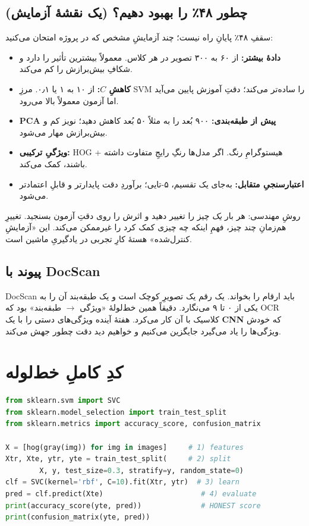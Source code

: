 \documentclass[12pt,a4paper]{article}
\begin{document}
\subsection{چطور ۴۸٪ را بهبود دهیم؟ (یک نقشهٔ آزمایش)}

سقفِ ۴۸٪ پایانِ راه نیست؛ چند آزمایشِ مشخص که در پروژه امتحان می‌کنید:

\begin{itemize}
  \item \textbf{دادهٔ بیشتر:} از ۶۰ به ۳۰۰ تصویر در هر کلاس. معمولاً بیشترین تأثیر را دارد و شکافِ بیش‌برازش را کم می‌کند.
  \item \textbf{کاهشِ $C$:} از ۱۰ به ۱ یا ۰٫۱. مرزِ SVM را ساده‌تر می‌کند؛ دقتِ آموزش پایین می‌آید اما آزمون معمولاً بالا می‌رود.
  \item \textbf{PCA پیش از طبقه‌بندی:} ۹۰۰ بُعد را به مثلاً ۵۰ بُعد کاهش دهید؛ نویز کم و بیش‌برازش مهار می‌شود.
  \item \textbf{ویژگیِ ترکیبی:} HOG + هیستوگرامِ رنگ. اگر مدل‌ها رنگِ رایجِ متفاوت داشته باشند، کمک می‌کند.
  \item \textbf{اعتبارسنجیِ متقابل:} به‌جای یک تقسیم، ۵-تایی؛ برآوردِ دقت پایدارتر و قابلِ اعتمادتر می‌شود.
\end{itemize}

\begin{nokte}
روشِ مهندسی: هر بار \emph{یک} چیز را تغییر دهید و اثرش را روی دقتِ آزمون بسنجید. تغییرِ هم‌زمانِ چند چیز، فهمِ اینکه چه چیزی کمک کرد را غیرممکن می‌کند. این «آزمایشِ کنترل‌شده» هستهٔ کارِ تجربی در یادگیریِ ماشین است.
\end{nokte}

\subsection{پیوند با DocScan}

DocScan باید ارقام را بخواند. یک رقم یک تصویرِ کوچک است و یک طبقه‌بند آن را به یکی از ۰ تا ۹ می‌نگارد. دقیقاً همین خط‌لولهٔ «ویژگی $\rightarrow$ طبقه‌بند» بود که OCRِ کلاسیک با آن کار می‌کرد. هفتهٔ آینده ویژگی‌های دستی را با یک \textbf{CNN} که خودش ویژگی‌ها را یاد می‌گیرد جایگزین می‌کنیم و خواهیم دید دقت چطور جهش می‌کند.

\section{کدِ کاملِ خط‌لوله}

\begin{ltrcode}
\begin{lstlisting}[language=Python]
from sklearn.svm import SVC
from sklearn.model_selection import train_test_split
from sklearn.metrics import accuracy_score, confusion_matrix

X = [hog(gray(img)) for img in images]     # 1) features
Xtr, Xte, ytr, yte = train_test_split(     # 2) split
        X, y, test_size=0.3, stratify=y, random_state=0)
clf = SVC(kernel='rbf', C=10).fit(Xtr, ytr)  # 3) learn
pred = clf.predict(Xte)                       # 4) evaluate
print(accuracy_score(yte, pred))              # HONEST score
print(confusion_matrix(yte, pred))
\end{lstlisting}
\end{ltrcode}
\end{document}
